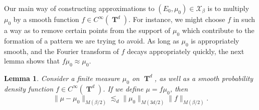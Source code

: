 \documentclass[dvipsnames,letterpaper,12pt]{article}
\numberwithin{equation}{section}
\DeclareMathOperator{\TT}{\mathbf{T}}
\newtheorem{lemma}[theorem]{Lemma}
\numberwithin{theorem}{section}
\begin{document}
Our main way of constructing approximations to $(E_0,\mu_0) \in \mathcal{X}_\beta$ is to multiply $\mu_0$ by a smooth function $f \in C^\infty(\TT^d)$. For instance, we might choose $f$ in such a way as to remove certain points from the support of $\mu_0$ which contribute to the formation of a pattern we are trying to avoid. As long as $\mu_0$ is appropriately smooth, and the Fourier transform of $f$ decays appropriately quickly, the next lemma shows that $f \mu_0 \approx \mu_0$.

\begin{lemma} \label{LemmaTTSICICS}
    Consider a finite measure $\mu_0$ on $\TT^d$, as well as a smooth probability density function $f \in C^\infty(\TT^d)$. If we define $\mu = f \mu_0$, then
    \[ \| \mu - \mu_0 \|_{M(\beta/2)} \lesssim_d \| \mu_0 \|_{M(3d/2)} \| f \|_{M(\beta/2)}. \]
\end{lemma}
\end{document}
